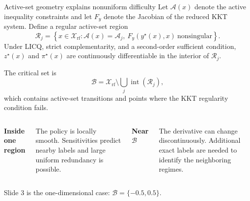\documentclass[aspectratio=169,10pt]{beamer}
\newcommand{\Xr}{\mathcal{X}_{\mathrm{rf}}}
\begin{document}
\begin{frame}{Active-set geometry explains nonuniform difficulty}
Let $\mathcal A(x)$ denote the active inequality constraints and let $F_y$ denote the Jacobian of the reduced KKT system. Define a regular active-set region
\[
  \mathcal R_j=\left\{x\in\Xr:\mathcal A(x)=\mathcal A_j,\ F_y(y^\star(x),x)\ \text{nonsingular}\right\}.
\]
Under LICQ, strict complementarity, and a second-order sufficient condition, $z^\star(x)$ and $\pi^\star(x)$ are continuously differentiable in the interior of $\mathcal R_j$.

The critical set is
\[
  \mathcal B=\Xr\setminus\bigcup_j\operatorname{int}(\mathcal R_j),
\]
which contains active-set transitions and points where the KKT regularity condition fails.

\begin{columns}[T,onlytextwidth]
\textbf{Inside one region}

The policy is locally smooth. Sensitivities predict nearby labels and large uniform redundancy is possible.

\textbf{Near $\mathcal B$}

The derivative can change discontinuously. Additional exact labels are needed to identify the neighboring regimes.
\end{columns}

\vspace{0.2cm}
\colorbox{PaleGold}{\parbox{0.9\textwidth}{\centering Slide 3 is the one-dimensional case: $\mathcal B=\{-0.5,0.5\}$.}}
\end{frame}
\end{document}

